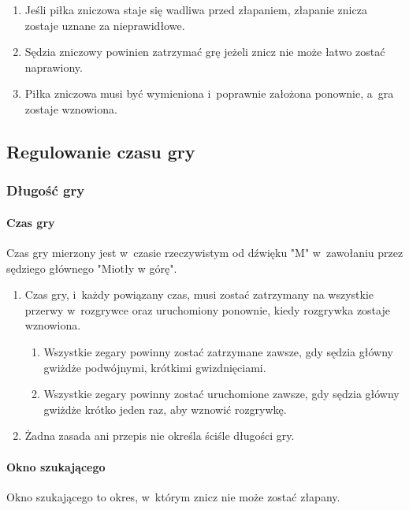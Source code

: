 \documentclass[12pt,a4paper]{article}
\begin{document}
\begin{enumerate}
\begin{enumerate}
		      \item Jeśli piłka zniczowa staje się wadliwa przed złapaniem, złapanie
		            znicza zostaje uznane za nieprawidłowe.

		      \item Sędzia zniczowy powinien zatrzymać grę jeżeli znicz nie może łatwo
		            zostać naprawiony.

		      \item Piłka zniczowa musi być wymieniona i~poprawnie założona ponownie, a~gra zostaje wznowiona.
	      \end{enumerate}
\end{enumerate}

\subsection{Regulowanie czasu gry}

\subsubsection{Długość gry}

\paragraph{Czas gry}
Czas gry mierzony jest w~czasie
rzeczywistym od dźwięku "M" w~zawołaniu przez sędziego głównego "Miotły
w górę".

\begin{enumerate}
	\item Czas gry, i~każdy powiązany czas, musi zostać zatrzymany na wszystkie
	      przerwy w~rozgrywce oraz uruchomiony ponownie, kiedy rozgrywka zostaje
	      wznowiona.
	      \begin{enumerate}
		      \item Wszystkie zegary powinny zostać zatrzymane zawsze, gdy sędzia główny
		            gwiżdże podwójnymi, krótkimi gwizdnięciami.

		      \item Wszystkie zegary powinny zostać uruchomione zawsze, gdy sędzia
		            główny gwiżdże krótko jeden raz, aby wznowić rozgrywkę.
	      \end{enumerate}

	\item Żadna zasada ani przepis nie określa ściśle długości gry.
\end{enumerate}

\paragraph{Okno szukającego}
Okno szukającego to okres, w~którym
znicz nie może zostać złapany.
\end{document}
